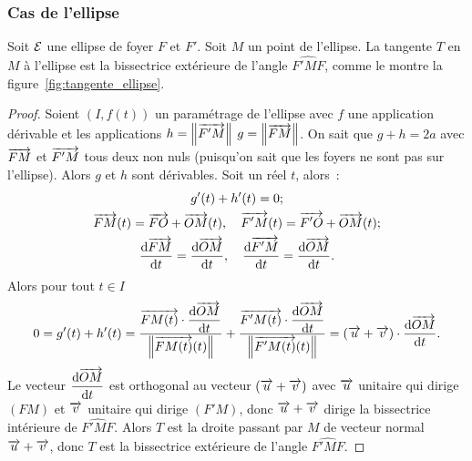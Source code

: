 \subsubsection{Cas de l'ellipse}
\begin{prop}
  Soit \(\mathcal{E}\) une ellipse de foyer \(F\) et \(F'\). Soit \(M\) un 
  point de l'ellipse. La tangente \(T\) en \(M\) à l'ellipse est la 
  bissectrice extérieure de l'angle \(\widehat{F'MF}\), comme le montre 
  la figure~\ref{fig:tangente_ellipse}.
\end{prop}
\begin{proof}
  Soient \((I,f(t))\) un paramétrage de l'ellipse avec \(f\) une 
  application dérivable et les applications \(h=\left\lVert\overrightarrow{F'M}\right\rVert\) 
  \(g=\left\lVert\overrightarrow{FM}\right\rVert\). On sait que \(g+h=2a\) avec \(\overrightarrow{FM}\) et 
  \(\overrightarrow{F'M}\) tous deux non nuls (puisqu'on sait que les foyers ne 
  sont pas sur l'ellipse). Alors \(g\) et \(h\) sont dérivables. Soit un 
  réel \(t\), alors~:
  \begin{gather}
    g'(t)+h'(t)=0; \\
    \overrightarrow{FM}(t)=\overrightarrow{FO}+\overrightarrow{OM}(t), \quad 
    \overrightarrow{F'M}(t)=\overrightarrow{F'O}+\overrightarrow{OM}(t);\\
    \dfrac{\mathrm{d} \overrightarrow{FM}}{\mathrm{d} t}=\dfrac{\mathrm{d} \overrightarrow{OM}}{\mathrm{d} t}, \quad 
    \dfrac{\mathrm{d} \overrightarrow{F'M}}{\mathrm{d} t}=\dfrac{\mathrm{d} \overrightarrow{OM}}{\mathrm{d} t}.
  \end{gather}
  Alors pour tout \(t \in I\)
  \begin{equation}
    0=g'(t)+h'(t)=\frac{\overrightarrow{FM(t)}\cdot\dfrac{\mathrm{d} \overrightarrow{OM}}{\mathrm{d} t}}{\left\lVert\overrightarrow{FM(t)}(t)\right\rVert} 
    + 
    \frac{\overrightarrow{F'M(t)}\cdot\dfrac{\mathrm{d} \overrightarrow{OM}}{\mathrm{d} t}}{\left\lVert\overrightarrow{F'M(t)}(t)\right\rVert}=(\overrightarrow{u}+\overrightarrow{v})\cdot 
    \dfrac{\mathrm{d} \overrightarrow{OM}}{\mathrm{d} t}.
  \end{equation}
  Le vecteur \(\dfrac{\mathrm{d} \overrightarrow{OM}}{\mathrm{d} t}\) est orthogonal au vecteur 
  \((\overrightarrow{u}+\overrightarrow{v})\) avec \(\overrightarrow{u}\) unitaire qui dirige \((FM)\) 
  et \(\overrightarrow{v}\) unitaire qui dirige \((F'M)\), donc 
  \(\overrightarrow{u}+\overrightarrow{v}\) dirige la bissectrice intérieure de 
  \(\widehat{F'MF}\). Alors \(T\) est la droite passant par \(M\) de 
  vecteur normal \(\overrightarrow{u}+\overrightarrow{v}\), donc \(T\) est la bissectrice 
  extérieure de l'angle \(\widehat{F'MF}\).
\end{proof}

